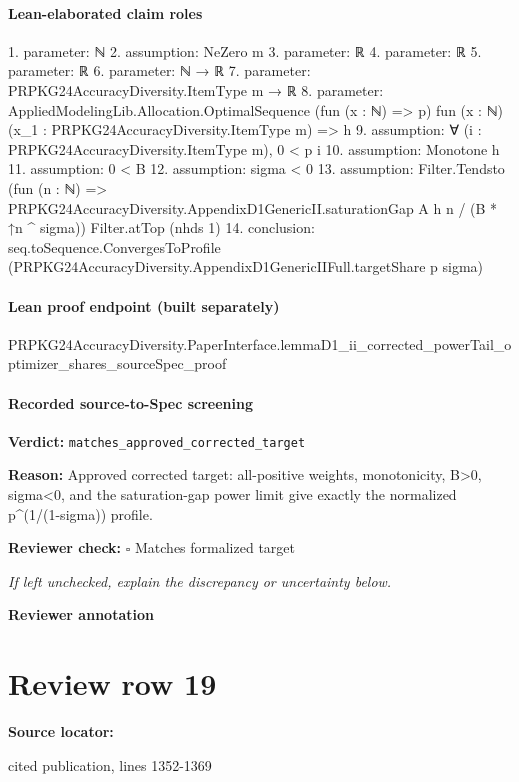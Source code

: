 \documentclass[10pt]{article}
\newcommand{\reviewerbox}{%
  \par\noindent\fbox{\parbox{0.96\linewidth}{\rule{0pt}{0.38in}}}\par
}
\newcommand{\reviewmatch}[1]{%
  \par\noindent\textbf{Reviewer check:} $\square$\; #1\par
  \noindent\emph{If left unchecked, explain the discrepancy or uncertainty below.}\par
}
\begin{document}
\paragraph{Lean-elaborated claim roles}\begin{ReviewVerbatim}
1. parameter: ℕ
2. assumption: NeZero m
3. parameter: ℝ
4. parameter: ℝ
5. parameter: ℝ
6. parameter: ℕ → ℝ
7. parameter: PRPKG24AccuracyDiversity.ItemType m → ℝ
8. parameter: AppliedModelingLib.Allocation.OptimalSequence (fun (x : ℕ) => p)
  fun (x : ℕ) (x_1 : PRPKG24AccuracyDiversity.ItemType m) => h
9. assumption: ∀ (i : PRPKG24AccuracyDiversity.ItemType m), 0 < p i
10. assumption: Monotone h
11. assumption: 0 < B
12. assumption: sigma < 0
13. assumption: Filter.Tendsto (fun (n : ℕ) => PRPKG24AccuracyDiversity.AppendixD1GenericII.saturationGap A h n / (B * ↑n ^ sigma))
  Filter.atTop (nhds 1)
14. conclusion: seq.toSequence.ConvergesToProfile (PRPKG24AccuracyDiversity.AppendixD1GenericIIFull.targetShare p sigma)
\end{ReviewVerbatim}

\paragraph{Lean proof endpoint (built separately)}\begin{ReviewVerbatim}
PRPKG24AccuracyDiversity.PaperInterface.lemmaD1_ii_corrected_powerTail_optimizer_shares_sourceSpec_proof
\end{ReviewVerbatim}

\paragraph{Recorded source-to-Spec screening}
\textbf{Verdict:} \texttt{matches\_approved\_corrected\_target}
\\
{\raggedright
\textbf{Reason:} Approved corrected target:\allowbreak{} all-\allowbreak{}positive weights, monotonicity, B>0, sigma<0, and the saturation-\allowbreak{}gap power limit give exactly the normalized p\textasciicircum{}(1/\allowbreak{}(1-\allowbreak{}sigma)) profile.\allowbreak{}
\par}
\reviewmatch{Matches formalized target}
\noindent\textbf{Reviewer annotation}\par
\reviewerbox
\clearpage
\hypertarget{source-claim-3f921e813126282a}{}
\section*{Review row 19}
\textbf{Source locator:} {\footnotesize\raggedright cited publication, lines 1352-\allowbreak{}1369\par}
\end{document}
